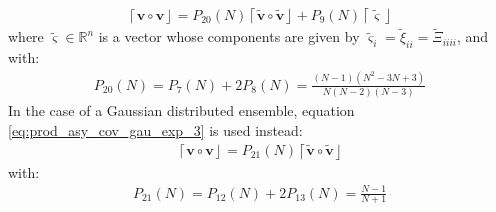 \documentclass[12pt]{scrartcl}
\begin{document}
\begin{align}
\label{eq:prod_asy_var_exp_mu}
\left\lceil \mathbf{v} \circ \mathbf{v} \right\rfloor = P_{20}(N) \left\lceil\widetilde{\mathbf{v}} \circ \widetilde{\mathbf{v}}\right\rfloor + P_9(N) \left\lceil\widetilde{\boldsymbol{\varsigma}}\right\rfloor
\end{align}
where $\widetilde{\boldsymbol{\varsigma}} \in \mathbb{R}^n$ is a vector whose components are given by $\widetilde{\varsigma}_i = \widetilde{\xi}_{ii} = \widetilde{\Xi}_{iiii}$, and with:
\begin{align}
P_{20}(N) = P_7(N) + 2 P_8(N) =  \frac{(N-1)(N^2-3N+3)}{N(N-2)(N-3)}
\end{align}
$  $\\
In the case of a Gaussian distributed ensemble, equation \eqref{eq:prod_asy_cov_gau_exp_3} is used instead:
\begin{align}
\label{eq:prod_asy_var_gau_exp_mu}
\left\lceil \mathbf{v} \circ \mathbf{v} \right\rfloor = P_{21}(N) \left\lceil\widetilde{\mathbf{v}} \circ \widetilde{\mathbf{v}}\right\rfloor
\end{align}
with:
\begin{align}
P_{21}(N) = P_{12}(N) + 2 P_{13}(N) = \frac{N-1}{N+1}
\end{align}
\end{document}
